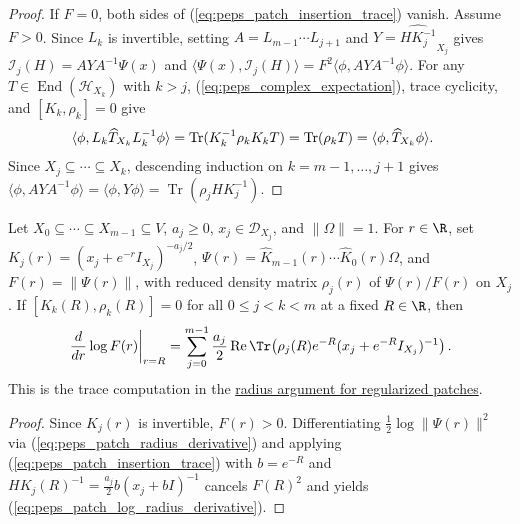 \begin{proof}
    \leanok
    If $F=0$, both sides of (\ref{eq:peps_patch_insertion_trace}) vanish. Assume $F>0$.
    Since $L_k$ is invertible, setting $A=L_{m-1}\cdots L_{j+1}$ and
    $Y=\widehat{H K_j^{-1}}_{X_j}$ gives $\mathcal I_j(H)=A Y A^{-1}\Psi(x)$ and
    $\langle\Psi(x),\mathcal I_j(H)\rangle=F^2\langle\phi,A Y A^{-1}\phi\rangle$.
    For any $T\in\operatorname{End}(\mathcal H_{X_k})$ with $k>j$, (\ref{eq:peps_complex_expectation}), trace cyclicity, and $[K_k,\rho_k]=0$ give
    \begin{align}
        \langle\phi,L_k\widehat T_{X_k}L_k^{-1}\phi\rangle
         & =\operatorname{Tr}(K_k^{-1}\rho_k K_k T)
        =\operatorname{Tr}(\rho_k T)
        =\langle\phi,\widehat T_{X_k}\phi\rangle.\notag
    \end{align}
    Since $X_j\subseteq\cdots\subseteq X_k$, descending induction on $k=m-1,\ldots,j+1$ gives
    $\langle\phi,A Y A^{-1}\phi\rangle=\langle\phi,Y\phi\rangle=\operatorname{Tr}(\rho_j H K_j^{-1})$.
\end{proof}


\begin{lemma}
    \label{thm:peps_patch_log_radius_derivative_of_outer_commute}
    \leanok
    Let $X_0\subseteq\cdots\subseteq X_{m-1}\subseteq V$, $a_j\ge0$,
    $x_j\in\mathcal D_{X_j}$, and $\|\Omega\|=1$.
    For $r\in\R$, set $K_j(r)=(x_j+e^{-r}I_{X_j})^{-a_j/2}$,
    $\Psi(r)=\widehat K_{m-1}(r)\cdots\widehat K_0(r)\Omega$,
    and $F(r)=\|\Psi(r)\|$, with reduced density matrix $\rho_j(r)$ of $\Psi(r)/F(r)$ on $X_j$.
    If $[K_k(R),\rho_k(R)]=0$ for all $0\le j<k<m$ at a fixed $R\in\R$, then
    \begin{align}
        \left.\frac{d}{dr}\log F(r)\right|_{r=R}
        =\sum_{j=0}^{m-1}\frac{a_j}{2}
        \operatorname{Re}\Tr\!\left(
        \rho_j(R)e^{-R}(x_j+e^{-R}I_{X_j})^{-1}\right).
        \label{eq:peps_patch_log_radius_derivative}
    \end{align}
    This is the trace computation in the
    \href{https://github.com/openai/math/blob/adc7f1241b42e322a6451854ab7e4b4c146bf78a/preprints/Polynomial-PEPS-approximation-of-gapped-square-grid-ground-states-September-24-2026/build/sections/03-patches.tex\#L453-L466}{radius argument for regularized patches}.
\end{lemma}
\begin{proof}
    \leanok
    Since $K_j(r)$ is invertible, $F(r)>0$.
    Differentiating $\frac12\log\|\Psi(r)\|^2$ via (\ref{eq:peps_patch_radius_derivative}) and applying (\ref{eq:peps_patch_insertion_trace}) with $b=e^{-R}$ and $H K_j(R)^{-1}=\frac{a_j}{2}b(x_j+bI)^{-1}$ cancels $F(R)^2$ and yields (\ref{eq:peps_patch_log_radius_derivative}).
\end{proof}

